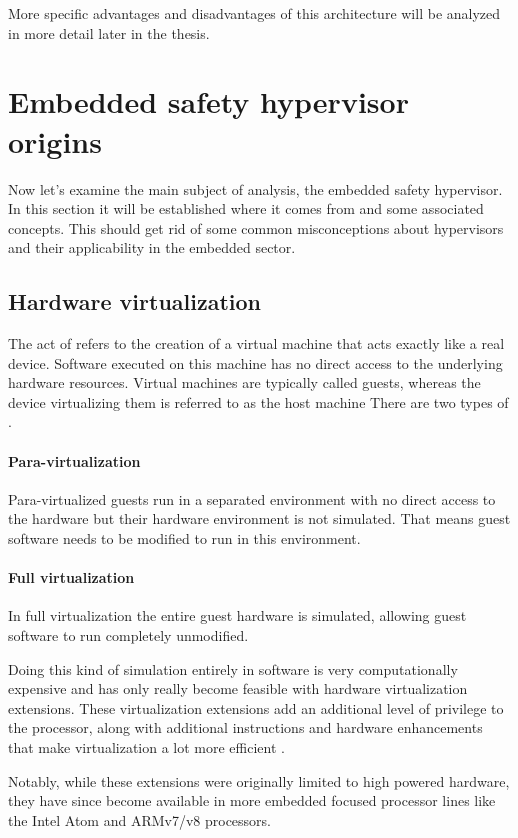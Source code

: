 More specific advantages and disadvantages of this architecture will be analyzed in more detail later in the thesis.


\section{Embedded safety hypervisor origins}
Now let's examine the main subject of analysis, the embedded safety hypervisor. In this section it will be established where it comes from and some associated concepts. This should get rid of some common misconceptions about hypervisors and their applicability in the embedded sector.
\subsection{Hardware virtualization} \label{hw-virt}
The act of  refers to the creation of a virtual machine  that acts exactly like a real device. Software executed on this machine has no direct access to the underlying hardware resources. Virtual machines are typically called guests, whereas the device virtualizing them is referred to as the host machine
There are two types of .
\paragraph{Para-virtualization}
Para-virtualized guests run in a separated environment with no direct access to the hardware but their hardware environment is not simulated. That means guest software needs to be modified to run in this environment.
\paragraph{Full virtualization}
In full virtualization the entire guest hardware is simulated, allowing guest software to run completely unmodified.

Doing this kind of simulation entirely in software is very computationally expensive and has only really become feasible with hardware virtualization extensions. These virtualization extensions add an additional level of privilege to the processor, along with additional instructions and hardware enhancements that make virtualization a lot more efficient \cite{ARM.v8.2018}.

Notably, while these extensions were originally limited to high powered hardware, they have since become available in more embedded focused processor lines like the Intel Atom and ARMv7/v8 processors.
